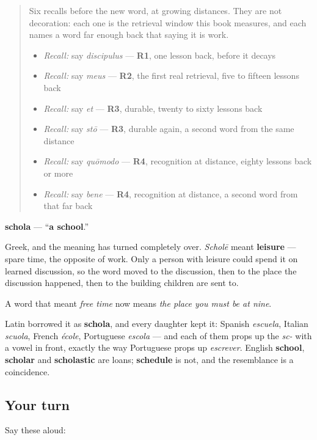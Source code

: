 \begin{quote}
Six recalls before the new word, at growing distances. They are not decoration: each one is the retrieval window this book measures, and each names a word far enough back that saying it is work.

\begin{itemize}
\raggedright
  \item \emph{Recall:} say \emph{discipulus} — \textbf{R1}, one lesson back, before it decays
  \item \emph{Recall:} say \emph{meus} — \textbf{R2}, the first real retrieval, five to fifteen lessons back
  \item \emph{Recall:} say \emph{et} — \textbf{R3}, durable, twenty to sixty lessons back
  \item \emph{Recall:} say \emph{stō} — \textbf{R3}, durable again, a second word from the same distance
  \item \emph{Recall:} say \emph{quōmodo} — \textbf{R4}, recognition at distance, eighty lessons back or more
  \item \emph{Recall:} say \emph{bene} — \textbf{R4}, recognition at distance, a second word from that far back
\end{itemize}
\end{quote}

\begin{cousinweb}
\textbf{schola} — \textquotedblleft{}\textbf{a school}.\textquotedblright{}

Greek, and the meaning has turned completely over. \emph{Scholē} meant \textbf{leisure} — spare time, the opposite of work. Only a person with leisure could spend it on learned discussion, so the word moved to the discussion, then to the place the discussion happened, then to the building children are sent to.

A word that meant \emph{free time} now means \emph{the place you must be at nine}.

Latin borrowed it as \textbf{schola}, and every daughter kept it: Spanish \emph{escuela}, Italian \emph{scuola}, French \emph{école}, Portuguese \emph{escola} — and each of them props up the \emph{sc-} with a vowel in front, exactly the way Portuguese props up \emph{escrever}. English \textbf{school}, \textbf{scholar} and \textbf{scholastic} are loans; \textbf{schedule} is not, and the resemblance is a coincidence.
\end{cousinweb}

\subsection*{Your turn}
Say these aloud:

